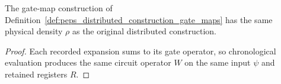 \begin{lemma}
    \label{thm:peps_distributed_construction_gate_maps_density}
    \leanok
    The gate-map construction of
    Definition~\ref{def:peps_distributed_construction_gate_maps} has the same
    physical density $\rho$ as the original distributed construction.
\end{lemma}
\begin{proof}
    \leanok
    Each recorded expansion sums to its gate operator, so chronological
    evaluation produces the same circuit operator $W$ on the same input $\psi$
    and retained registers $R$.
\end{proof}

